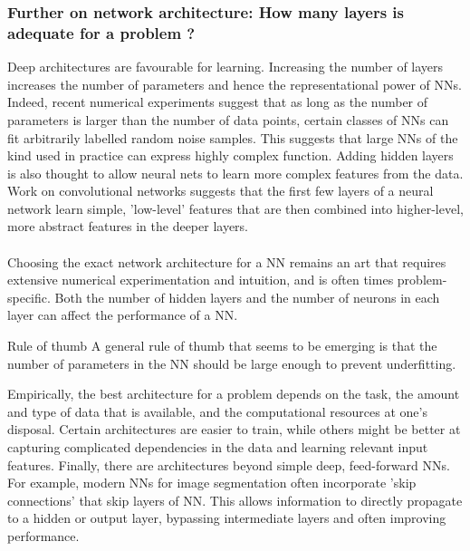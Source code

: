 \subsubsection{Further on network architecture: How many layers is adequate for a problem ?}
\label{subsubsec:dnnBestPracticeArchitecture}
Deep architectures are favourable for learning. Increasing the number of layers increases the number of parameters and hence the representational power of NNs. Indeed, recent numerical experiments suggest that as long as the number of parameters is larger than the number of data points, certain classes of NNs can fit arbitrarily labelled random noise samples. This suggests that large NNs of the kind used in practice can express highly complex function. Adding hidden layers is also thought to allow neural nets to learn more complex features from the data. Work on convolutional networks suggests that the first few layers of a neural network learn simple, ’low-level’ features that are then combined into higher-level, more abstract features in the deeper layers.\\
\\
Choosing the exact network architecture for a NN remains an art that requires extensive numerical experimentation and intuition, and is often times problem-specific. Both the number of hidden layers and the number of neurons in each layer can affect the performance of a NN.
\begin{mybox}{Rule of thumb}
	A general rule of thumb that seems to be emerging is that the number of parameters in the NN should be large enough to prevent underfitting.
\end{mybox}
Empirically, the best architecture for a problem depends on the task, the amount and type of data that is available, and the computational resources at one's disposal. Certain architectures are easier to train, while others might be better at capturing complicated dependencies in the data and learning relevant input features. Finally, there are architectures beyond simple deep, feed-forward NNs.
For example, modern NNs for image segmentation often incorporate ’skip connections’ that skip layers of NN. This allows information to directly propagate to a hidden or output layer, bypassing intermediate layers and often improving performance.

